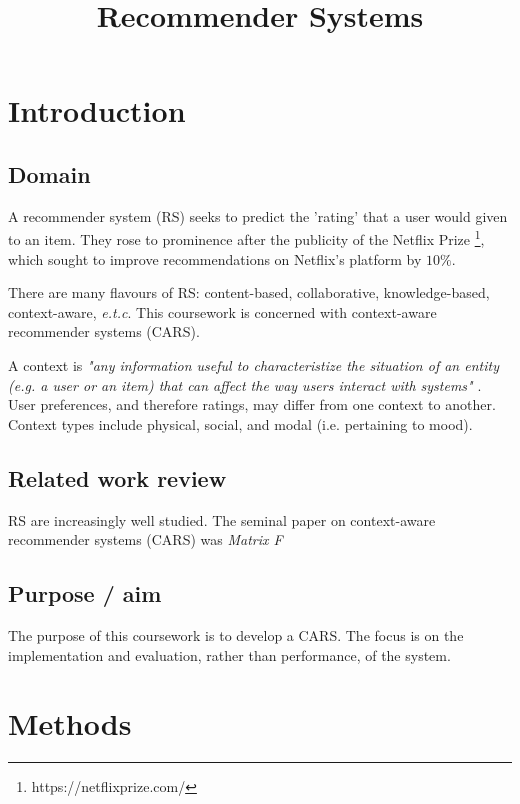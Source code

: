 \documentclass[conference]{IEEEtran}
\begin{document}
\title{Recommender Systems}

\author{}

\maketitle

\section{Introduction}

\subsection{Domain}

A recommender system (RS) seeks to predict the 'rating' that a user would given to an item. They rose to prominence after the publicity of the Netflix Prize \footnote{https://netflixprize.com/}, which sought to improve recommendations on Netflix's platform by $10\%$. 

There are many flavours of RS: content-based, collaborative, knowledge-based, context-aware, \textit{e.t.c}. This coursework is concerned with context-aware recommender systems (CARS). 

A context is \textit{"any information useful to characteristize the situation of an entity (e.g. a user or an item) that can affect the way users interact with systems"} \cite{abowd_et_al_1999}. User preferences, and therefore ratings, may differ from one context to another. Context types include physical, social, and modal (i.e. pertaining to mood). 

\subsection{Related work review}

RS are increasingly well studied. The seminal paper on context-aware recommender systems (CARS) was \textit{Matrix F}

\subsection{Purpose / aim}

The purpose of this coursework is to develop a CARS. The focus is on the implementation and evaluation, rather than performance, of the system. 

\section{Methods}
\end{document}
